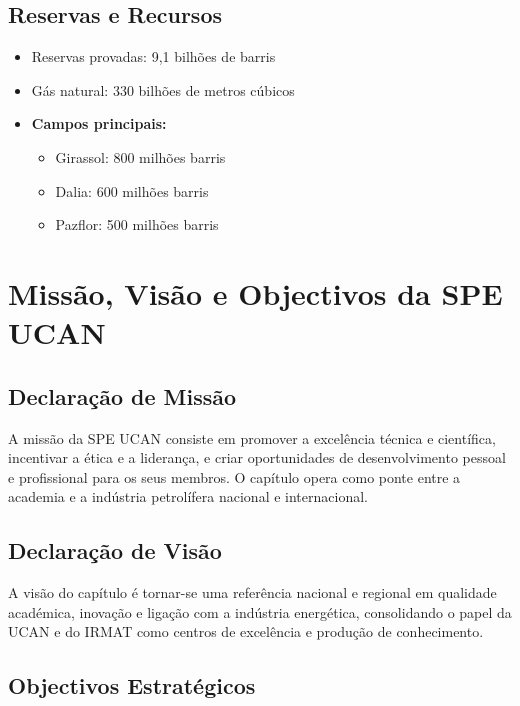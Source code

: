 \documentclass[12pt]{article}
\begin{document}
\subsection{Reservas e Recursos}

\begin{itemize}
    \item Reservas provadas: 9,1 bilhões de barris
    \item Gás natural: 330 bilhões de metros cúbicos
    \item \textbf{Campos principais:}
    \begin{itemize}
        \item Girassol: 800 milhões barris
        \item Dalia: 600 milhões barris
        \item Pazflor: 500 milhões barris
    \end{itemize}
\end{itemize}

\newpage

\section{Missão, Visão e Objectivos da SPE UCAN}

\subsection{Declaração de Missão}

A missão da SPE UCAN consiste em promover a excelência técnica e científica, incentivar a ética e a liderança, e criar oportunidades de desenvolvimento pessoal e profissional para os seus membros. O capítulo opera como ponte entre a academia e a indústria petrolífera nacional e internacional.

\subsection{Declaração de Visão}

A visão do capítulo é tornar-se uma referência nacional e regional em qualidade académica, inovação e ligação com a indústria energética, consolidando o papel da UCAN e do IRMAT como centros de excelência e produção de conhecimento.

\subsection{Objectivos Estratégicos}
\end{document}
